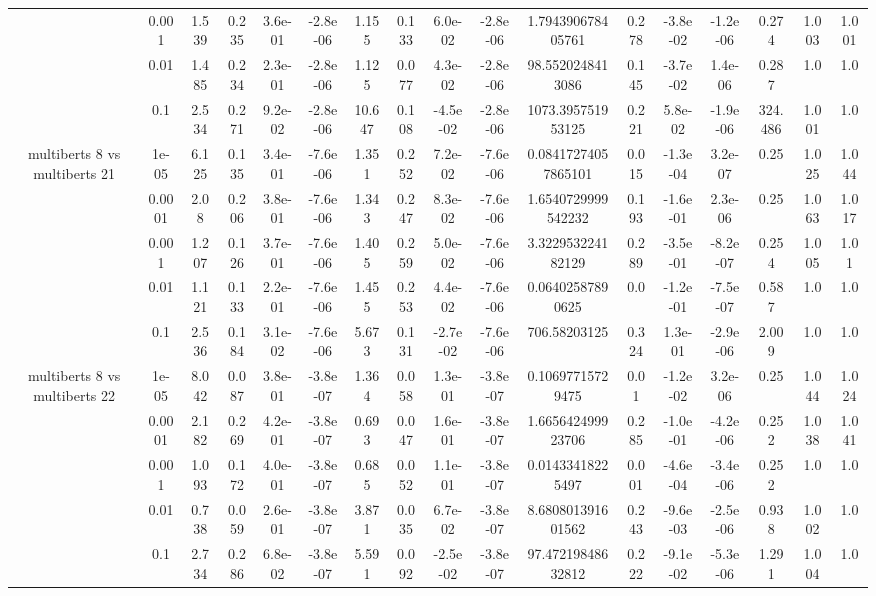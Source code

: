 \begin{tabular}{|c|c|c|c|c|c|c|c|c|c|c|c|c|c|c|c|c|}
 & 0.001 & 1.539 & 0.235 & 3.6e-01 & -2.8e-06 & 1.155 & 0.133 & 6.0e-02 & -2.8e-06 & 1.794390678405761 & 0.278 & -3.8e-02 & -1.2e-06 & 0.274 & 1.003 & 1.001 \\
 & 0.01 & 1.485 & 0.234 & 2.3e-01 & -2.8e-06 & 1.125 & 0.077 & 4.3e-02 & -2.8e-06 & 98.5520248413086 & 0.145 & -3.7e-02 & 1.4e-06 & 0.287 & 1.0 & 1.0 \\
 & 0.1 & 2.534 & 0.271 & 9.2e-02 & -2.8e-06 & 10.647 & 0.108 & -4.5e-02 & -2.8e-06 & 1073.395751953125 & 0.221 & 5.8e-02 & -1.9e-06 & 324.486 & 1.001 & 1.0 \\
\hline
\multirow{5}{*}{multiberts 8 vs multiberts 21} & 1e-05 & 6.125 & 0.135 & 3.4e-01 & -7.6e-06 & 1.351 & 0.252 & 7.2e-02 & -7.6e-06 & 0.08417274057865101 & 0.015 & -1.3e-04 & 3.2e-07 & 0.25 & 1.025 & 1.044 \\
 & 0.0001 & 2.08 & 0.206 & 3.8e-01 & -7.6e-06 & 1.343 & 0.247 & 8.3e-02 & -7.6e-06 & 1.6540729999542232 & 0.193 & -1.6e-01 & 2.3e-06 & 0.25 & 1.063 & 1.017 \\
 & 0.001 & 1.207 & 0.126 & 3.7e-01 & -7.6e-06 & 1.405 & 0.259 & 5.0e-02 & -7.6e-06 & 3.322953224182129 & 0.289 & -3.5e-01 & -8.2e-07 & 0.254 & 1.005 & 1.01 \\
 & 0.01 & 1.121 & 0.133 & 2.2e-01 & -7.6e-06 & 1.455 & 0.253 & 4.4e-02 & -7.6e-06 & 0.06402587890625 & 0.0 & -1.2e-01 & -7.5e-07 & 0.587 & 1.0 & 1.0 \\
 & 0.1 & 2.536 & 0.184 & 3.1e-02 & -7.6e-06 & 5.673 & 0.131 & -2.7e-02 & -7.6e-06 & 706.58203125 & 0.324 & 1.3e-01 & -2.9e-06 & 2.009 & 1.0 & 1.0 \\
\hline
\multirow{5}{*}{multiberts 8 vs multiberts 22} & 1e-05 & 8.042 & 0.087 & 3.8e-01 & -3.8e-07 & 1.364 & 0.058 & 1.3e-01 & -3.8e-07 & 0.10697715729475 & 0.01 & -1.2e-02 & 3.2e-06 & 0.25 & 1.044 & 1.024 \\
 & 0.0001 & 2.182 & 0.269 & 4.2e-01 & -3.8e-07 & 0.693 & 0.047 & 1.6e-01 & -3.8e-07 & 1.665642499923706 & 0.285 & -1.0e-01 & -4.2e-06 & 0.252 & 1.038 & 1.041 \\
 & 0.001 & 1.093 & 0.172 & 4.0e-01 & -3.8e-07 & 0.685 & 0.052 & 1.1e-01 & -3.8e-07 & 0.01433418225497 & 0.001 & -4.6e-04 & -3.4e-06 & 0.252 & 1.0 & 1.0 \\
 & 0.01 & 0.738 & 0.059 & 2.6e-01 & -3.8e-07 & 3.871 & 0.035 & 6.7e-02 & -3.8e-07 & 8.680801391601562 & 0.243 & -9.6e-03 & -2.5e-06 & 0.938 & 1.002 & 1.0 \\
 & 0.1 & 2.734 & 0.286 & 6.8e-02 & -3.8e-07 & 5.591 & 0.092 & -2.5e-02 & -3.8e-07 & 97.47219848632812 & 0.222 & -9.1e-02 & -5.3e-06 & 1.291 & 1.004 & 1.0 \\

\end{tabular}
